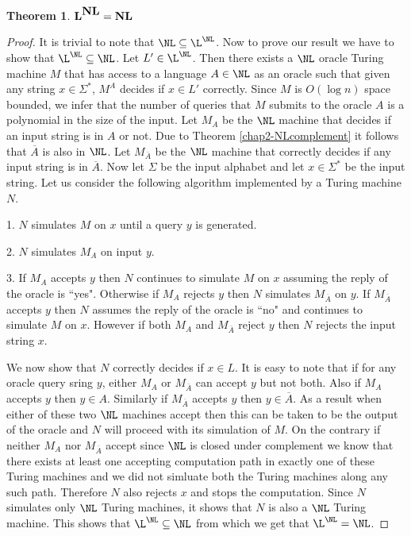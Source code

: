 \documentclass{amsbook}
\newtheorem{theorem}{Theorem}[chapter]
\theoremstyle{definition}
\theoremstyle{remark}
\numberwithin{section}{chapter}
\numberwithin{equation}{chapter}
\newcommand{\boldL}{\mbox{\rm\bf L}}
\newcommand{\boldNL}{\mbox{\rm \bf NL}}
\begin{document}
\begin{theorem}\label{nlclosureunderTuring}
$\boldL^{\boldNL}=\boldNL$
\end{theorem}
\begin{proof}
It is trivial to note that $\NL\subseteq\L^{\rm{\NL}}$. Now to prove our result we have to show that $\L^{\NL}\subseteq\NL$. Let $L'\in\L^{\NL}$. Then there exists a $\NL$ oracle Turing machine $M$ that has access to a language $A\in\NL$ as an oracle such that given any string $x\in\Sigma^*$, $M^A$ decides if $x\in L'$ correctly. Since $M$ is $O(\log n)$ space bounded, we infer that the number of queries that $M$ submits to the oracle $A$ is a polynomial in the size of the input. Let $M_A$ be the $\NL$ machine that decides if an input string is in $A$ or not. Due to Theorem \ref{chap2-NLcomplement} it follows that $\overline{A}$ is also in $\NL$. Let $M_{\overline{A}}$ be the $\NL$ machine that correctly decides if any input string is in $\overline{A}$. Now let $\Sigma$ be the input alphabet and let $x\in\Sigma^*$ be the input string. Let us consider the following algorithm implemented by a Turing machine $N$.

1. $N$ simulates $M$ on $x$ until a query $y$ is generated.

2. $N$ simulates $M_A$ on input $y$.

3. If $M_A$ accepts $y$ then $N$ continues to simulate $M$ on $x$ assuming the reply of the oracle is ``yes". Otherwise if $M_A$ rejects $y$ then $N$ simulates $M_{\overline{A}}$ on $y$. If $M_{\overline{A}}$ accepts $y$ then $N$ assumes the reply of the oracle is ``no" and continues to simulate $M$ on $x$. However if both $M_A$ and $M_{\overline{A}}$ reject $y$ then $N$ rejects the input string $x$.

We now show that $N$ correctly decides if $x\in L$. It is easy to note that if for any oracle query sring $y$, either $M_A$ or $M_{\overline{A}}$ can accept $y$ but not both. Also if $M_A$ accepts $y$ then $y\in A$. Similarly if $M_{\overline{A}}$ accepts $y$ then $y\in\overline{A}$. As a result when either of these two $\NL$ machines accept then this can be taken to be the output of the oracle and $N$ will proceed with its simulation of $M$. On the contrary if neither $M_A$ nor $M_{\overline{A}}$ accept since $\NL$ is closed under complement we know that there exists at least one accepting computation path in exactly one of these Turing machines and we did not simluate both the Turing machines along any such path. Therefore $N$ also rejects $x$ and stops the computation. Since $N$ simulates only $\NL$ Turing machines, it shows that $N$ is also a $\NL$ Turing machine. This shows that $\L^{\NL}\subseteq\NL$ from which we get that $\L^{\NL}=\NL$.
\end{proof}
\end{document}
